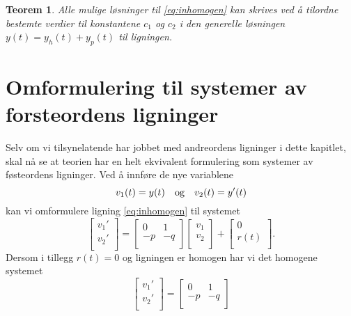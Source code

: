 \documentclass{article}
\newtheorem{thm}{Teorem}\surroundwithmdframed{thm}
\theoremstyle{definition}
\theoremstyle{remark}
\begin{document}
\begin{multicols*}{2}
\begin{thm} \label{thm:alle_mulige_losn_inhomogen}
  Alle mulige løsninger til \eqref{eq:inhomogen} kan skrives ved å tilordne bestemte verdier til konstantene $c_1$ og $c_2$ i den generelle løsningen $y(t) = y_h(t) + y_p(t)$ til ligningen.
\end{thm}


\section*{Omformulering til systemer av forsteordens ligninger}
Selv om vi tilsynelatende har jobbet med andreordens ligninger i dette kapitlet, skal nå se at teorien har en helt ekvivalent formulering som systemer av føsteordens ligninger. Ved å innføre de nye variablene
\begin{equation*}
  v_1(t) = y(t)\ \ \textnormal{ og }\ \ v_2(t) = y'(t)
\end{equation*}
kan vi omformulere ligning \eqref{eq:inhomogen} til systemet
\begin{equation*}
  \begin{bmatrix}
    v_1' \\
    v_2' \\
  \end{bmatrix}
  =
  \begin{bmatrix}
    0 & 1 \\
    -p & -q \\
  \end{bmatrix}
  \begin{bmatrix}
    v_1 \\
    v_2 \\
  \end{bmatrix}
  +
  \begin{bmatrix}
    0 \\
    r(t) \\
  \end{bmatrix}.
\end{equation*}
Dersom i tillegg $r(t) = 0$ og ligningen er homogen har vi det homogene systemet
\begin{equation*}
  \begin{bmatrix}
    v_1' \\
    v_2' \\
  \end{bmatrix}
  =
  \begin{bmatrix}
    0 & 1 \\
    -p & -q \\
  \end{bmatrix}

\end{equation*}
\end{multicols*}
\end{document}
